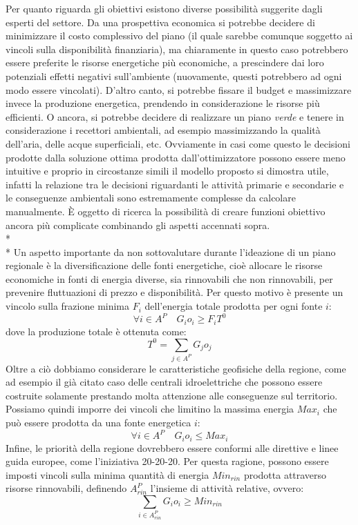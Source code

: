 Per quanto riguarda gli obiettivi esistono diverse possibilità suggerite dagli esperti del settore. Da una prospettiva economica si potrebbe decidere di minimizzare il costo complessivo del piano (il quale sarebbe comunque soggetto ai vincoli sulla disponibilità finanziaria), ma chiaramente in questo caso potrebbero essere preferite le risorse energetiche più economiche, a prescindere dai loro potenziali effetti negativi sull'ambiente (nuovamente, questi potrebbero ad ogni modo essere vincolati). D'altro canto, si potrebbe fissare il budget e massimizzare invece la produzione energetica, prendendo in considerazione le risorse più efficienti. O ancora, si potrebbe decidere di realizzare un piano \emph{verde} e tenere in considerazione i recettori ambientali, ad esempio massimizzando la qualità dell'aria, delle acque superficiali, etc. Ovviamente in casi come questo le decisioni prodotte dalla soluzione ottima prodotta dall'ottimizzatore possono essere meno intuitive e proprio in circostanze simili il modello proposto si dimostra utile, infatti la relazione tra le decisioni riguardanti le attività primarie e secondarie e le conseguenze ambientali sono estremamente complesse da calcolare manualmente. \`E oggetto di ricerca la possibilità di creare funzioni obiettivo ancora più complicate combinando gli aspetti accennati sopra.
\\*\\*
Un aspetto importante da non sottovalutare durante l'ideazione di un piano regionale è la diversificazione delle fonti energetiche, cioè allocare le risorse economiche in fonti di energia diverse, sia rinnovabili che non rinnovabili, per prevenire fluttuazioni di prezzo e disponibilità. Per questo motivo è presente un vincolo sulla frazione minima $F_i$ dell'energia totale prodotta per ogni fonte $i$: 
\begin{equation}
\label{eq:fracEner}
	\forall i \in A^P \quad G_i o_i \geq F_i T^0
\end{equation}  
dove la produzione totale è ottenuta come: 
\begin{equation}
\label{eq:prodTot}
	T^0 = \sum_{j \in A^P} G_j o_j 
\end{equation}  
Oltre a ciò dobbiamo considerare le caratteristiche geofisiche della regione, come ad esempio il già citato caso delle centrali idroelettriche che possono essere costruite solamente prestando molta attenzione alle conseguenze sul territorio. Possiamo quindi imporre dei vincoli che limitino la massima energia $Max_i$ che può essere prodotta da una fonte energetica $i$:
\begin{equation}
\label{eq:maxEner}
	\forall i \in A^P \quad G_i o_i \leq Max_i
\end{equation}  
Infine, le priorità della regione dovrebbero essere conformi alle direttive e linee guida europee, come l'iniziativa 20-20-20. Per questa ragione, possono essere imposti vincoli sulla minima quantità di energia $Min_{rin}$ prodotta attraverso risorse rinnovabili, definendo $A^P_{rin}$ l'insieme di attività relative, ovvero:
\begin{equation}
\label{eq:minEnerRen}
	\sum_{i \in A^P_{rin}} G_i o_i \geq  Min_{rin}
\end{equation}  

